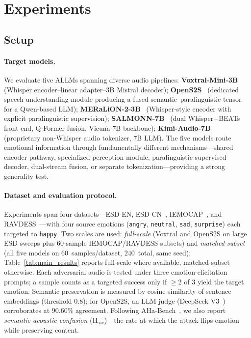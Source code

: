 
\section{Experiments}
\label{sec:experiments}
\setlength{\emergencystretch}{3em}

\subsection{Setup}
\label{sec:exp_setup}

\paragraph{Target models.}
We evaluate five ALLMs spanning diverse audio pipelines:
\textbf{Voxtral-Mini-3B}~\cite{voxtral} (Whisper encoder--linear adapter--3B Mistral decoder);
\textbf{OpenS2S}~\cite{opens2s} (dedicated speech-understanding module producing a fused semantic--paralinguistic tensor for a Qwen-based LLM);
\textbf{MERaLiON-2-3B}~\cite{meralion} (Whisper-style encoder with explicit paralinguistic supervision);
\textbf{SALMONN-7B}~\cite{salmonn} (dual Whisper+BEATs front end, Q-Former fusion, Vicuna-7B backbone);
\textbf{Kimi-Audio-7B}~\cite{kimiaudio} (proprietary non-Whisper audio tokenizer, 7B LLM).
The five models route emotional information through fundamentally different mechanisms---shared encoder pathway, specialized perception module, paralinguistic-supervised decoder, dual-stream fusion, or separate tokenization---providing a strong generality test.

\paragraph{Dataset and evaluation protocol.}
Experiments span four datasets---ESD-EN, ESD-CN~\cite{esd}, IEMOCAP~\cite{iemocap}, and RAVDESS~\cite{ravdess}---with four source emotions (\texttt{angry}, \texttt{neutral}, \texttt{sad}, \texttt{surprise}) each targeted to \texttt{happy}.
Two scales are used: \textit{full-scale} (Voxtral and OpenS2S on large ESD sweeps plus 60-sample IEMOCAP/RAVDESS subsets) and \textit{matched-subset} (all five models on 60~samples/dataset, 240~total, same seed); Table~\ref{tab:main_results} reports full-scale where available, matched-subset otherwise.
Each adversarial audio is tested under three emotion-elicitation prompts; a sample counts as a targeted success only if $\geq$2 of 3 yield the target emotion.
Semantic preservation is measured by cosine similarity of sentence embeddings (threshold $0.8$); for OpenS2S, an LLM judge (DeepSeek V3~\cite{deepseek}) corroborates at $90.60\%$ agreement.
Following AHa-Bench~\cite{aha-bench}, we also report \textit{semantic-acoustic confusion} (H$_{\text{sac}}$)---the rate at which the attack flips emotion while preserving content.

